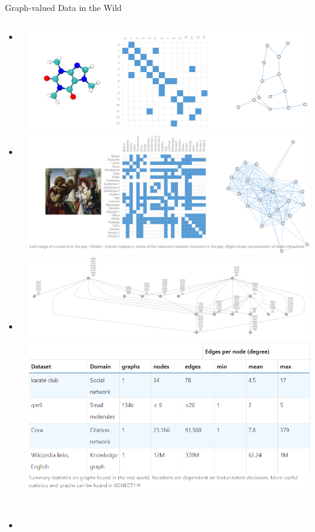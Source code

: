 \documentclass[
    11pt, %
    aspectratio=169, %
]{beamer}
\begin{document}
\begin{frame}{Graph-valued Data in the Wild}
    \begin{columns}[c]
        \begin{column}{.3\textwidth}
            \begin{itemize}[<+->]
                \item Molecules 
                \item Social networks
                \item Citation networks
                \item etc
            \end{itemize}
        \end{column}    

        \begin{column}{.7\textwidth}
            \centering
             {\includegraphics[width=.8\textwidth]{Images/molecules-as-graphs.png}}
             {\includegraphics[width=.8\textwidth]{Images/social-networks-as-graphs.png}}
             {\includegraphics[width=.9\textwidth]{Images/citation-graph.jpg}}
             {\includegraphics[width=.75\textwidth]{Images/graph-in-the-wild.png}}
        \end{column}
    \end{columns}
\end{frame}
\end{document}
